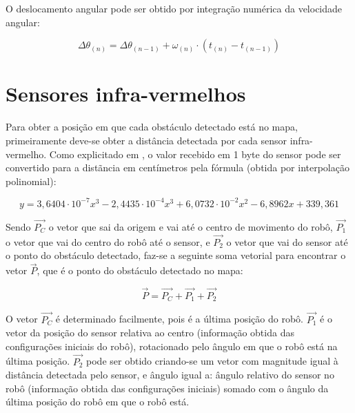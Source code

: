 O deslocamento angular pode ser obtido por integração numérica da velocidade angular:

\begin{equation}
  \Delta \theta_{(n)} = \Delta \theta_{(n - 1)} + \omega_{(n)} \cdot (t_{(n)} - t_{(n-1)})
  \label{eq:v_acel}
\end{equation}



\section{Sensores infra-vermelhos}

Para obter a posição em que cada obstáculo detectado está no mapa, primeiramente deve-se obter a distância detectada por cada sensor infra-vermelho. Como explicitado em \cite{bellator_2012}, o valor recebido em 1 byte do sensor pode ser convertido para a distãncia em centímetros pela fórmula (obtida por interpolação polinomial):

\begin{equation}
  y = 3,6404 \cdot 10^{-7} x^3 - 2,4435 \cdot 10^{-4} x^3 + 6,0732 \cdot 10^{-2} x^2 - 6,8962 x + 339,361
  \label{eq:IR_dist}
\end{equation}


Sendo $\overrightarrow{P_C}$ o vetor que sai da origem e vai até o centro de movimento do robô, $\overrightarrow{P_1}$ o vetor que vai do centro do robô até o sensor, e $\overrightarrow{P_2}$ o vetor que vai do sensor até o ponto do obstáculo detectado, faz-se a seguinte soma vetorial para encontrar o vetor $\overrightarrow{P}$, que é o ponto do obstáculo detectado no mapa:

\begin{equation}
  \overrightarrow{P} = \overrightarrow{P_C} + \overrightarrow{P_1} + \overrightarrow{P_2}
  \label{eq:IR_vector}
\end{equation}


O vetor $\overrightarrow{P_C}$ é determinado facilmente, pois é a última posição do robô. $\overrightarrow{P_1}$ é o vetor da posição do sensor relativa ao centro (informação obtida das configurações iniciais do robô), rotacionado pelo ângulo em que o robô está na última posição. $\overrightarrow{P_2}$ pode ser obtido criando-se um vetor com magnitude igual à distância detectada pelo sensor, e ângulo igual a: ângulo relativo do sensor no robô (informação obtida das configurações iniciais) somado com o ângulo da última posição do robô em que o robô está.

